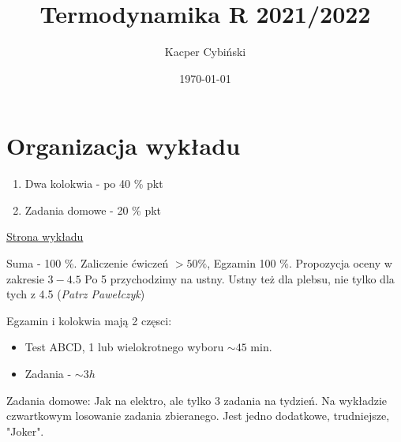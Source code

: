 \documentclass[12pt,a4paper]{report}
\title{Termodynamika R 2021/2022}
\author{Kacper Cybiński}
\date{\today}
\newcommand{\link}[2]{{\color{cyan} \href{#1}{#2}}}
\begin{document}
\maketitle


\chapter*{Organizacja wykładu}
\begin{enumerate}
    \item Dwa kolokwia - po 40 \% pkt
    \item Zadania domowe - 20 \% pkt
\end{enumerate}

{\color{blue} \link{http://www.fuw.edu.pl/~piotrek/stat2022}{Strona wykładu}}

Suma - 100 \%. Zaliczenie ćwiczeń $> 50 \%$, Egzamin 100 \%. Propozycja oceny w zakresie $3-4.5$ Po 5 przychodzimy na ustny. Ustny też dla plebsu, nie tylko dla tych z 4.5 ({\it Patrz Pawełczyk})

Egzamin i kolokwia mają 2 częsci:
\begin{itemize}
\item Test ABCD, 1 lub wielokrotnego wyboru $\sim 45$ min.
\item Zadania - $\sim 3h$
\end{itemize}

Zadania domowe: Jak na elektro, ale tylko 3 zadania na tydzień. Na wykładzie czwartkowym losowanie zadania zbieranego. Jest jedno dodatkowe, trudniejsze, "Joker".
\end{document}

